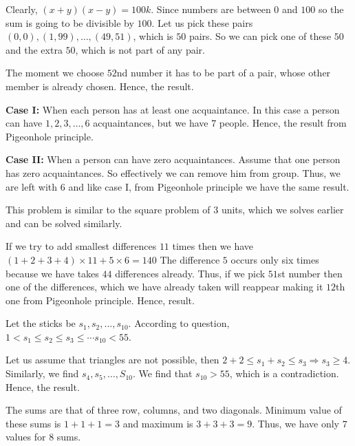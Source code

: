   Clearly, $(x + y)(x - y) = 100k$. Since numbers are between $0$ and $100$ so the sum is going to be
  divisible by $100$. Let us pick these pairs $(0, 0), (1, 99), \ldots, (49, 51)$, which is $50$ pairs. So
  we can pick one of these $50$ and the extra $50$, which is not part of any pair.

  The moment we choose $52$nd number it has to be part of a pair, whose other member is already
  chosen. Hence, the result.
\item {\bf Case I:} When each person has at least one acquaintance. In this case a person can have $1, 2, 3,
  \ldots, 6$ acquaintances, but we have $7$ people. Hence, the result from Pigeonhole principle.

  {\bf Case II:} When a person can have zero acquaintances. Assume that one person has zero
  acquaintances. So effectively we can remove him from group. Thus, we are left with $6$ and like case I,
  from Pigeonhole principle we have the same result.
\item This problem is similar to the square problem of $3$ units, which we solves earlier and can be solved
  similarly.
\item If we try to add smallest differences $11$ times then we have $(1 + 2 + 3 + 4)\times11 + 5\times6 =
  140$ The difference $5$ occurs only six times because we have takes $44$ differences already. Thus, if we
  pick $51$st number then one of the differences, which we have already taken will reappear making it $12$th
  one from Pigeonhole principle. Hence, result.
\item Let the sticks be $s_1, s_2, \ldots, s_{10}$. According to question, $1 < s_1 \leq s_2\leq s_3\leq
  \cdots s_{10} < 55$.

  Let us assume that triangles are not possible, then $2 + 2 \leq s_1 + s_2\leq s_3 \Rightarrow s_3\geq
  4$. Similarly, we find $s_4, s_5, \ldots, S_{10}$. We find that $s_{10} > 55$, which is a
  contradiction. Hence, the result.
\item The sums are that of three row, columns, and two diagonals. Minimum value of these sums is $1 + 1 + 1
  = 3$ and maximum is $3 + 3 + 3 = 9$. Thus, we have only $7$ values for $8$ sums.

